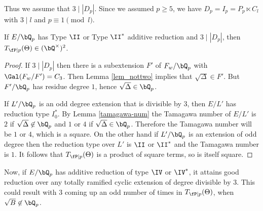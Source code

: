Thus we assume that $3 \mid |D_p|$. Since we assumed $p \geq 5$, we have $D_p = I_p = P_p \ltimes C_l$ with $3 \mid l$ and $p \equiv 1 \pmod l$.

\begin{lemma}
If $E / \bQ_p$ has Type $\II$ or Type $\II^*$ additive reduction and $3 \mid |D_p|$, then $T_{\fP \mid p}(\Theta) \in (\bQ^{\times})^2$. 
\end{lemma}

\begin{proof}
If $3 \mid |D_p|$ then there is a subextension $F'$ of $F_w / \bQ_p$ with $\Gal(F_w / F') = C_3$. Then Lemma \ref{lem_nottwo} implies that $\sqrt{\Delta} \in F'$. But $F' / \bQ_p$ has residue degree $1$, hence $\sqrt{\Delta} \in \bQ_p$. 

If $L' / \bQ_p$ is an odd degree extension that is divisible by $3$, then $E / L'$ has reduction type $I_0^*$. By Lemma \ref{tamagawa-num} the Tamagawa number of $E / L'$ is $2$ if $\sqrt{\Delta} \not\in \bQ_p$ and $1$ or $4$ if $\sqrt{\Delta} \in \bQ_p$. Therefore the Tamagawa number will be $1$ or $4$, which is a square.
On the other hand if $L' / \bQ_p$ is an extension of odd degree then the reduction type over $L'$ is $\II$ or $\II^*$ and the Tamagawa number is $1$. It follows that $T_{\fP \mid p}(\Theta)$ is a product of square terms, so is itself square.  
\end{proof} 

Now, if $E /\bQ_p$ has additive reduction of type $\IV$ or $\IV^*$, it attains good reduction over any totally ramified cyclic extension of degree divisible by $3$. This could result with $3$ coming up an odd number of times in $T_{\fP \mid p}(\Theta)$, when $\sqrt{B} \not\in \bQ_p$. 

